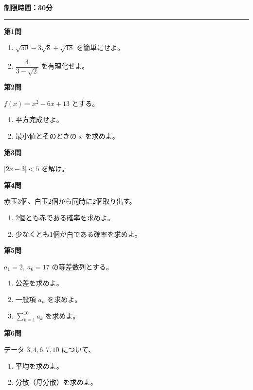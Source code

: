 \documentclass[lualatex,ja=standard]{bxjsarticle}
\begin{document}
\noindent\textbf{制限時間：30分}
\hrule
\vspace{0.8em}

\textbf{第1問}
\begin{enumerate}
\item $\sqrt{50}-3\sqrt{8}+\sqrt{18}$ を簡単にせよ。
\item $\dfrac{4}{3-\sqrt{2}}$ を有理化せよ。
\end{enumerate}

\vspace{0.5em}
\textbf{第2問}

$f(x)=x^2-6x+13$ とする。
\begin{enumerate}
\item 平方完成せよ。
\item 最小値とそのときの $x$ を求めよ。
\end{enumerate}

\vspace{0.5em}
\textbf{第3問}

$|2x-3|<5$ を解け。

\vspace{0.5em}
\textbf{第4問}

赤玉3個、白玉2個から同時に2個取り出す。
\begin{enumerate}
\item 2個とも赤である確率を求めよ。
\item 少なくとも1個が白である確率を求めよ。
\end{enumerate}

\vspace{0.5em}
\textbf{第5問}

$a_1=2,\ a_6=17$ の等差数列とする。
\begin{enumerate}
\item 公差を求めよ。
\item 一般項 $a_n$ を求めよ。
\item $\displaystyle \sum_{k=1}^{10} a_k$ を求めよ。
\end{enumerate}

\vspace{0.5em}
\textbf{第6問}

データ $3,4,6,7,10$ について、
\begin{enumerate}
\item 平均を求めよ。
\item 分散（母分散）を求めよ。
\end{enumerate}
\end{document}
